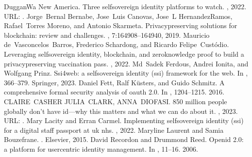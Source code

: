 \documentclass[letterpaper,10pt,english]{jupyterBook}
\begin{document}
\begin{sphinxthebibliography}{DugganWa}
\sphinxAtStartPar
New America. Three self\sphinxhyphen{}sovereign identity platforms to watch. , 2022. URL: .
\sphinxAtStartPar
Jorge Bernal Bernabe, Jose Luis Canovas, Jose L Hernandez\sphinxhyphen{}Ramos, Rafael Torres Moreno, and Antonio Skarmeta. Privacy\sphinxhyphen{}preserving solutions for blockchain: review and challenges. , 7:164908–164940, 2019.
\sphinxAtStartPar
Mauricio de Vasconcelos Barros, Frederico Schardong, and Ricardo Felipe Custódio. Leveraging self\sphinxhyphen{}sovereign identity, blockchain, and zero\sphinxhyphen{}knowledge proof to build a privacy\sphinxhyphen{}preserving vaccination pass. , 2022.
\sphinxAtStartPar
Md Sadek Ferdous, Andrei Ionita, and Wolfgang Prinz. Ssi4web: a self\sphinxhyphen{}sovereign identity (ssi) framework for the web. In , 366–379. Springer, 2023.
\sphinxAtStartPar
Daniel Fett, Ralf Küsters, and Guido Schmitz. A comprehensive formal security analysis of oauth 2.0. In , 1204–1215. 2016.
\sphinxAtStartPar
CLAIRE CASHER JULIA CLARK, ANNA DIOFASI. 850 million people globally don’t have id—why this matters and what we can do about it. , 2023. URL: .
\sphinxAtStartPar
Mary Lacity and Erran Carmel. Implementing self\sphinxhyphen{}sovereign identity (ssi) for a digital staff passport at uk nhs. , 2022.
\sphinxAtStartPar
Maryline Laurent and Samia Bouzefrane. . Elsevier, 2015.
\sphinxAtStartPar
David Recordon and Drummond Reed. Openid 2.0: a platform for user\sphinxhyphen{}centric identity management. In , 11–16. 2006.

\end{sphinxthebibliography}
\end{document}
